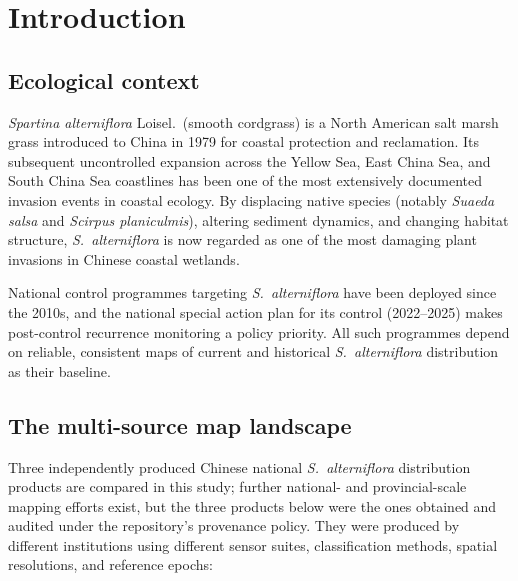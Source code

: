 \documentclass[11pt]{article}
\begin{document}
\section{Introduction}
\label{sec:introduction}

\subsection{Ecological context}

\textit{Spartina alterniflora} Loisel.\ (smooth cordgrass) is a North American
salt marsh grass introduced to China in 1979 for coastal protection and
reclamation\citep{li_2009_spartina, zhang_2023_jag}.
Its subsequent uncontrolled expansion across the Yellow Sea, East China Sea,
and South China Sea coastlines has been one of the most extensively documented
invasion events in coastal ecology\citep{li_2009_spartina}. By displacing native
species (notably \textit{Suaeda salsa} and \textit{Scirpus planiculmis}),
altering sediment dynamics, and changing habitat structure, \textit{S.~alterniflora}
is now regarded as one of the most damaging plant invasions in Chinese
coastal wetlands\citep{li_2009_spartina, zhang_2023_jag}.

National control programmes targeting \textit{S.~alterniflora} have been
deployed since the 2010s, and the national special action plan for its
control (2022--2025) makes post-control recurrence monitoring a policy
priority\citep{cma_2021_eradication}. All such programmes depend on
reliable, consistent maps of current and historical \textit{S.~alterniflora}
distribution as their baseline.

\subsection{The multi-source map landscape}

Three independently produced Chinese national \textit{S.~alterniflora} distribution
products are compared in this study; further national- and provincial-scale
mapping efforts exist\citep{zhang_2023_jag, li_2022_jem, zhao_2023_rse_saltmarsh,
chen_2023_rse_mangrove, zuo_2025_sai},
but the three products below were the ones obtained and audited under the
repository's provenance policy. They were produced by different institutions
using different sensor suites, classification methods, spatial resolutions, and
reference epochs:
\end{document}

